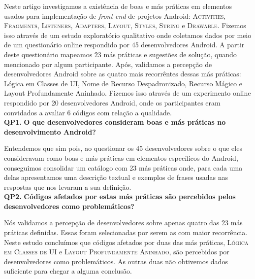 Neste artigo investigamos a existência de boas e más práticas em elementos usados para implementação de \textit{front-end} de projetos Android: \textsc{Activities}, \textsc{Fragments}, \textsc{Listeners}, \textsc{Adapters}, \textsc{Layout}, \textsc{Styles}, \textsc{String} e \textsc{Drawable}. Fizemos isso através de um estudo exploratório qualitativo onde coletamos dados por meio de um questionário online respondido por 45 desenvolvedores Android. A partir deste questionário mapeamos 23 más práticas e sugestões de solução, quando mencionado por algum participante. Após, validamos a percepção de desenvolvedores Android sobre as quatro mais recorrêntes dessas más práticas: Lógica em Classes de UI, Nome de Recurso Despadronizado, Recurso Mágico e Layout Profundamente Aninhado. Fizemos isso através de um experimento online respondido por 20 desenvolvedores Android, onde os participantes eram convidados a avaliar 6 códigos com relação a qualidade. \\

\textbf{QP1.} \textbf{O que desenvolvedores consideram boas e más práticas no desenvolvimento Android?} 

Entendemos que sim pois, ao questionar os 45 desenvolvedores sobre o que eles consideravam como boas e más práticas em elementos específicos do Android, conseguimos consolidar um catálogo com 23 más práticas onde, para cada uma delas apresentamos uma descrição textual e exemplos de frases usadas nas respostas que nos levaram a sua definição. \\

\textbf{QP2.} \textbf{Códigos afetados por estas más práticas são percebidos pelos desenvolvedores como problemáticos?}

Nós validamos a percepção de desenvolvedores sobre apenas quatro das 23 más práticas definidas. Essas foram selecionadas por serem as com maior recorrência. Neste estudo concluímos que códigos afetados por duas das más práticas, \textsc{Lógica em Classes de UI} e \textsc{Layout Profundamente Aninhado}, são percebidos por desenvolvedores como problemáticos. As outras duas não obtivemos dados suficiente para chegar a alguma conclusão.



